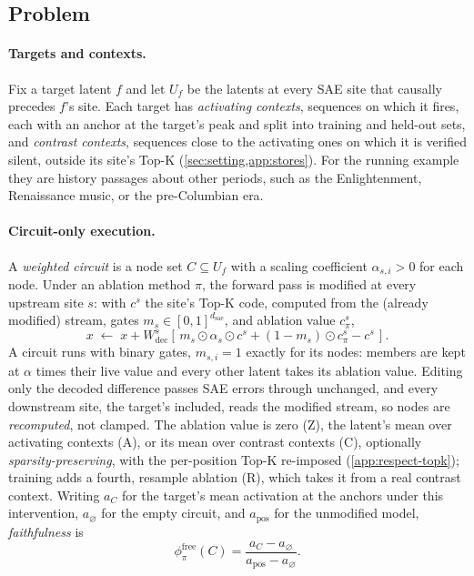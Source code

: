 \documentclass[10pt]{article}
\begin{document}
\subsection{Problem}
\label{sec:problem}
\label{sec:evidence}

\paragraph{Targets and contexts.}
Fix a target latent $f$ and let $U_f$ be the latents at every SAE site that causally precedes $f$'s site.
Each target has \emph{activating contexts}, sequences on which it fires, each with an anchor at the target's peak and split into training and held-out sets, and \emph{contrast contexts}, sequences close to the activating ones on which it is verified silent, outside its site's Top-K (\cref{sec:setting,app:stores}).
For the running example they are history passages about other periods, such as the Enlightenment, Renaissance music, or the pre-Columbian era.

\paragraph{Circuit-only execution.}
A \emph{weighted circuit} is a node set $C \subseteq U_f$ with a scaling coefficient $\alpha_{s,i} > 0$ for each node.
Under an ablation method $\pi$, the forward pass is modified at every upstream site $s$: with $c^{s}$ the site's Top-K code, computed from the (already modified) stream, gates $m_s \in [0, 1]^{d_{\mathrm{sae}}}$, and ablation value $c^{s}_{\pi}$,
\begin{equation}\label{eq:edit}
    x \;\leftarrow\; x + W_{\mathrm{dec}}^{s}\!\left[\, m_s \odot \alpha_s \odot c^{s} + (1 - m_s) \odot c^{s}_{\pi} - c^{s} \,\right].
\end{equation}
A circuit runs with binary gates, $m_{s,i} = 1$ exactly for its nodes: members are kept at $\alpha$ times their live value and every other latent takes its ablation value.
Editing only the decoded difference passes SAE errors through unchanged, and every downstream site, the target's included, reads the modified stream, so nodes are \emph{recomputed}, not clamped.
The ablation value is zero (Z), the latent's mean over activating contexts (A), or its mean over contrast contexts (C), optionally \emph{sparsity-preserving}, with the per-position Top-K re-imposed (\cref{app:respect-topk}); training adds a fourth, resample ablation (R), which takes it from a real contrast context.
Writing $a_C$ for the target's mean activation at the anchors under this intervention, $a_{\varnothing}$ for the empty circuit, and $a_{\mathrm{pos}}$ for the unmodified model, \emph{faithfulness} is
\[
    \phi^{\mathrm{free}}_{\pi}(C) = \frac{a_C - a_{\varnothing}}{a_{\mathrm{pos}} - a_{\varnothing}}.
\]
\end{document}
